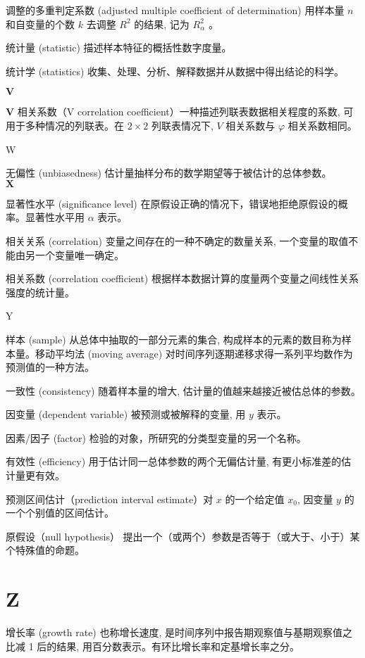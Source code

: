 \documentclass[10pt]{article}
\begin{document}
\begin{CJK*}{UTF8}{bsmi}
调整的多重判定系数 (adjusted multiple coefficient of determination) 用样本量 $n$ 和自变量的个数 $k$ 去调整 $R^{2}$ 的结果, 记为 $R_{\alpha}^{2}$ 。

统计量 (statistic) 描述样本特征的概括性数字度量。

统计学 (statistics) 收集、处理、分析、解释数据并从数据中得出结论的科学。

$\mathbf{V}$

$\boldsymbol{V}$ 相关系数（V correlation coefficient）一种描述列联表数据相关程度的系数, 可用于多种情况的列联表。在 $2 \times 2$ 列联表情况下, $V$ 相关系数与 $\varphi$ 相关系数相同。

W

无偏性 (unbiasedness) 估计量抽样分布的数学期望等于被估计的总体参数。\\
$\mathbf{X}$

显著性水平 (significance level) 在原假设正确的情况下，错误地拒绝原假设的概率。显著性水平用 $\alpha$ 表示。

相关关系 (correlation) 变量之间存在的一种不确定的数量关系, 一个变量的取值不能由另一个变量唯一确定。

相关系数 (correlation coefficient) 根据样本数据计算的度量两个变量之间线性关系强度的统计量。

Y

样本 (sample) 从总体中抽取的一部分元素的集合, 构成样本的元素的数目称为样本量。移动平均法 (moving average) 对时间序列逐期递移求得一系列平均数作为预测值的一种方法。

一致性 (consistency) 随着样本量的增大, 估计量的值越来越接近被估总体的参数。

因变量 (dependent variable) 被预测或被解释的变量, 用 $y$ 表示。

因素/因子 (factor) 检验的对象，所研究的分类型变量的另一个名称。

有效性 (efficiency) 用于估计同一总体参数的两个无偏估计量, 有更小标准差的估计量更有效。

预测区间估计（prediction interval estimate）对 $x$ 的一个给定值 $x_{0}$, 因变量 $y$ 的一个个别值的区间估计。

原假设（null hypothesis） 提出一个（或两个）参数是否等于（或大于、小于）某个特殊值的命题。

\section*{Z}
增长率 (growth rate) 也称增长速度, 是时间序列中报告期观察值与基期观察值之比减 1 后的结果, 用百分数表示。有环比增长率和定基增长率之分。


\end{CJK*}
\end{document}
